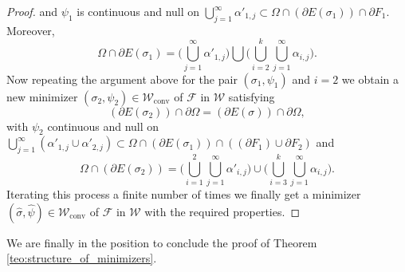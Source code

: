 \documentclass[JEP,XML,SOM,Unicode, NoFloatCountersInSection,published]{cedram}
\let\Om\Omega
\newcommand\admclassconv{{\mathcal W_\mathrm{conv}}}
\theoremstyle{definition}
\begin{document}
\begin{proof}
and $\psi_1$ is continuous and null on $\bigcup_{j=1}^\infty\alpha'_{1,j}\subset \Om\cap(\partial E(\sigma_{1}))\cap\partial F_1$.
Moreover,\vspace*{-3pt}
\begin{equation*}
\Om\cap \partial E(\sigma_1)=\biggl(\bigcup_{j=1}^\infty\alpha'_{1,j})\bigcup
(\bigcup_{i=2}^k\bigcup_{j=1}^\infty \alpha_{i,j}\biggr).
\end{equation*}
Now repeating the argument above for the pair $(\sigma_1,\psi_1)$ and $i=2$ we obtain a new minimizer $(\sigma_2,\psi_2)\in\admclassconv$ of $\mathcal F$ in $\mathcal W$ satisfying\vspace*{-3pt}
\begin{equation*}
(\partial E(\sigma_{2}))\cap\partial\Om= (\partial E(\sigma))\cap\partial\Om,
\end{equation*}
with $\psi_2$ continuous and null on $\bigcup_{j=1}^\infty(\alpha'_{1,j}\cup\alpha'_{2,j})\subset \Om \cap (\partial E(\sigma_{1}))\cap((\partial F_1)\cup\partial F_2)$
and\vspace*{-3pt}
\begin{equation*}
\Om \cap (\partial E(\sigma_2))=\biggl(\bigcup_{i=1}^2\bigcup_{j=1}^\infty\alpha'_{i,j})\cup
(\bigcup_{i=3}^k\bigcup_{j=1}^\infty \alpha_{i,j}\biggr).
\end{equation*}
Iterating this process a finite number of times we finally get a minimizer $(\widehat\sigma,\widehat\psi)\in\admclassconv$ of $\mathcal F$ in $\mathcal W$ with the required properties.
\end{proof}

We are finally in the position to conclude the proof of Theorem \ref{teo:structure_of_minimizers}.
\end{document}
